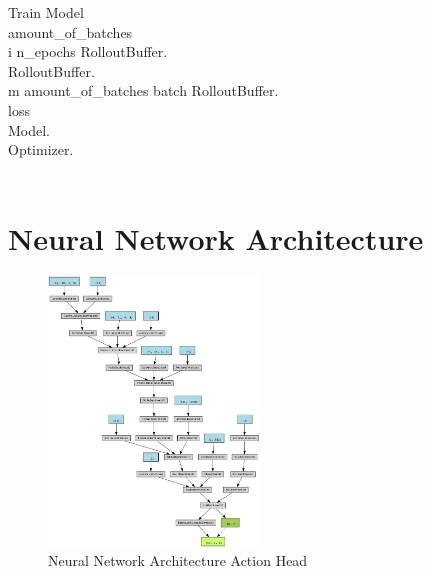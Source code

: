 \renewcommand{\thepseudonum}{\roman{pseudonum}}
\begin{pseudocode}{Train Model}{ }
    \\

    amount\_of\_batches \GETS {}\\
    \FOR i  \TO n\_epochs \DO
    \BEGIN
    RolloutBuffer.\\
    RolloutBuffer.\\
    \FOR m  \TO amount\_of\_batches \DO
    \BEGIN
    batch \GETS RolloutBuffer.\\
    loss \GETS {}\\
    Model.\\
    Optimizer.\\
    \END\\
    \END
    \ENDPROCEDURE
    \label{pseudocode:train_model}
\end{pseudocode}

\section{Neural Network Architecture}

\begin{figure}
    \centering
    \includegraphics[width=0.5\textwidth]{Bilder/action_graph.png}
    \caption{Neural Network Architecture Action Head}
    \label{fig:action_graph}
\end{figure}

